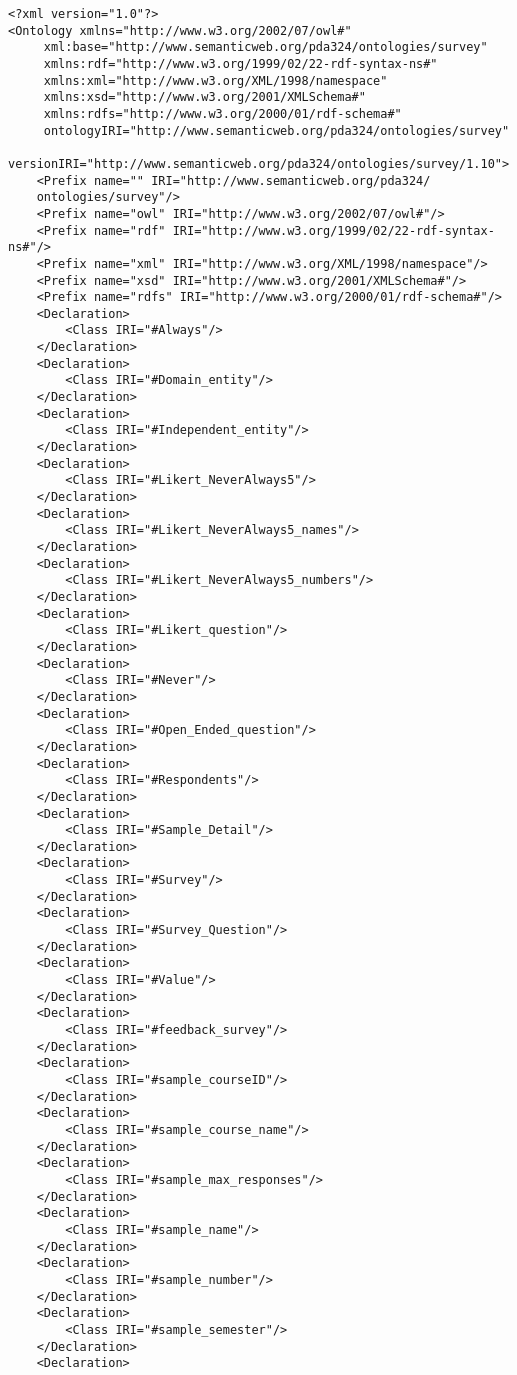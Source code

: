 \begin{lstlisting}
<?xml version="1.0"?>
<Ontology xmlns="http://www.w3.org/2002/07/owl#"
     xml:base="http://www.semanticweb.org/pda324/ontologies/survey"
     xmlns:rdf="http://www.w3.org/1999/02/22-rdf-syntax-ns#"
     xmlns:xml="http://www.w3.org/XML/1998/namespace"
     xmlns:xsd="http://www.w3.org/2001/XMLSchema#"
     xmlns:rdfs="http://www.w3.org/2000/01/rdf-schema#"
     ontologyIRI="http://www.semanticweb.org/pda324/ontologies/survey"
     versionIRI="http://www.semanticweb.org/pda324/ontologies/survey/1.10">
    <Prefix name="" IRI="http://www.semanticweb.org/pda324/
    ontologies/survey"/>
    <Prefix name="owl" IRI="http://www.w3.org/2002/07/owl#"/>
    <Prefix name="rdf" IRI="http://www.w3.org/1999/02/22-rdf-syntax-ns#"/>
    <Prefix name="xml" IRI="http://www.w3.org/XML/1998/namespace"/>
    <Prefix name="xsd" IRI="http://www.w3.org/2001/XMLSchema#"/>
    <Prefix name="rdfs" IRI="http://www.w3.org/2000/01/rdf-schema#"/>
    <Declaration>
        <Class IRI="#Always"/>
    </Declaration>
    <Declaration>
        <Class IRI="#Domain_entity"/>
    </Declaration>
    <Declaration>
        <Class IRI="#Independent_entity"/>
    </Declaration>
    <Declaration>
        <Class IRI="#Likert_NeverAlways5"/>
    </Declaration>
    <Declaration>
        <Class IRI="#Likert_NeverAlways5_names"/>
    </Declaration>
    <Declaration>
        <Class IRI="#Likert_NeverAlways5_numbers"/>
    </Declaration>
    <Declaration>
        <Class IRI="#Likert_question"/>
    </Declaration>
    <Declaration>
        <Class IRI="#Never"/>
    </Declaration>
    <Declaration>
        <Class IRI="#Open_Ended_question"/>
    </Declaration>
    <Declaration>
        <Class IRI="#Respondents"/>
    </Declaration>
    <Declaration>
        <Class IRI="#Sample_Detail"/>
    </Declaration>
    <Declaration>
        <Class IRI="#Survey"/>
    </Declaration>
    <Declaration>
        <Class IRI="#Survey_Question"/>
    </Declaration>
    <Declaration>
        <Class IRI="#Value"/>
    </Declaration>
    <Declaration>
        <Class IRI="#feedback_survey"/>
    </Declaration>
    <Declaration>
        <Class IRI="#sample_courseID"/>
    </Declaration>
    <Declaration>
        <Class IRI="#sample_course_name"/>
    </Declaration>
    <Declaration>
        <Class IRI="#sample_max_responses"/>
    </Declaration>
    <Declaration>
        <Class IRI="#sample_name"/>
    </Declaration>
    <Declaration>
        <Class IRI="#sample_number"/>
    </Declaration>
    <Declaration>
        <Class IRI="#sample_semester"/>
    </Declaration>
    <Declaration>

\end{lstlisting}
